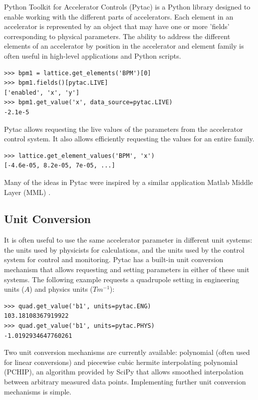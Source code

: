 \documentclass[a4paper,
               keeplastbox,   %
               ]{jacow}
\begin{document}
Python Toolkit for Accelerator Controls (Pytac) is a Python library designed to
enable working with the different parts of accelerators. Each element in an
accelerator is represented by an object that may have one or more 'fields' 
corresponding to physical parameters. The ability to address the different 
elements of an accelerator by position in the accelerator and element family
is often useful in high-level applications and Python scripts.

\begin{lstlisting}
>>> bpm1 = lattice.get_elements('BPM')[0]
>>> bpm1.fields()[pytac.LIVE]
['enabled', 'x', 'y']
>>> bpm1.get_value('x', data_source=pytac.LIVE)
-2.1e-5
\end{lstlisting}

 Pytac allows requesting the live values of the parameters from the accelerator
control system. It also allows efficiently requesting the values for an entire
family.

\begin{lstlisting}
>>> lattice.get_element_values('BPM', 'x')
[-4.6e-05, 8.2e-05, 7e-05, ...]
\end{lstlisting}

Many of the ideas in Pytac were inspired by a similar application Matlab Middle
Layer (MML) \cite{mml}.

\subsection{Unit Conversion}

It is often useful to use the same accelerator parameter in different unit systems:
the units used by physicists for calculations, and the units used by the control
system for control and monitoring. Pytac has a built-in unit conversion mechanism
that allows requesting and setting parameters in either of these unit systems. The
following example requests a quadrupole setting in engineering units ($A$) and
physics units ($Tm^{-1}$):

\begin{lstlisting}
>>> quad.get_value('b1', units=pytac.ENG)
103.18108367919922
>>> quad.get_value('b1', units=pytac.PHYS)
-1.0192934647760261
\end{lstlisting}

Two unit conversion mechanisms are currently available: polynomial (often used for 
linear conversions) and piecewise cubic hermite interpolating polynomial (PCHIP),
an algorithm provided by SciPy \cite{pchip} that allows smoothed interpolation 
between arbitrary measured data points. Implementing further unit conversion 
mechanisms is simple.
\end{document}
